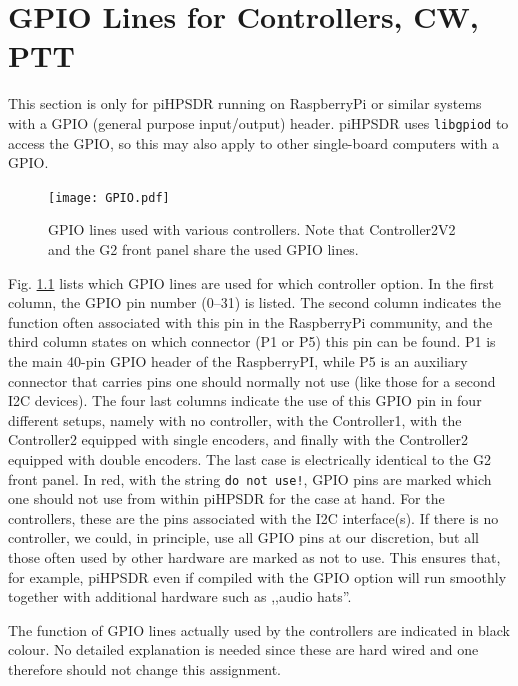 \documentclass[12pt]{book}
\def\pH{pi\-HPSDR\xspace}
\begin{document}
\chapter[RaspPi GPIO lines]{GPIO Lines for Controllers, CW, PTT}
\label{sec:gpio}
This section is only for \pH running on RaspberryPi or similar systems with a GPIO (general purpose
input/output) header. \pH uses \texttt{libgpiod} to access the GPIO, so this may also apply to
other single-board computers with a GPIO.

\begin{figure}[ht!]
\center
\texttt{[image: GPIO.pdf]}
\caption{GPIO lines used with various controllers. Note that Controller2V2 and the G2 front panel
share the used GPIO lines.}
\label{fig:GPIO}
\end{figure}

Fig. \ref{fig:GPIO} lists which GPIO lines are used for which controller option. In the first column,
the GPIO pin number (0--31) is listed. The second column indicates the function often
associated with this pin in the RaspberryPi community, and the third column states on which connector
(P1 or P5) this pin can be found. P1 is the main 40-pin GPIO header of the RaspberryPI, while P5 is
an auxiliary connector that carries pins one should normally not use (like those for a second I2C
devices). The four last columns indicate the use of this GPIO pin in four different setups, namely
with no controller, with the Controller1, with the Controller2 equipped with single encoders, and
finally with the Controller2 equipped with double encoders. The last case is electrically identical to
the G2 front panel. In red, with the string \texttt{do not use!}, GPIO pins are marked which one should
not use from within \pH for the case at hand. For the controllers, these are the pins associated
with the I2C interface(s). If there is no controller, we could, in principle, use all GPIO pins at our
discretion, but all those often used by other hardware are marked as not to use. This ensures that,
for example, \pH even if compiled with the GPIO option will run smoothly together with additional
hardware such as ,,audio hats''.

The function of GPIO lines actually used by the controllers are indicated in black colour. No detailed
explanation is needed since these are hard wired and one therefore should not change this assignment.
\end{document}
